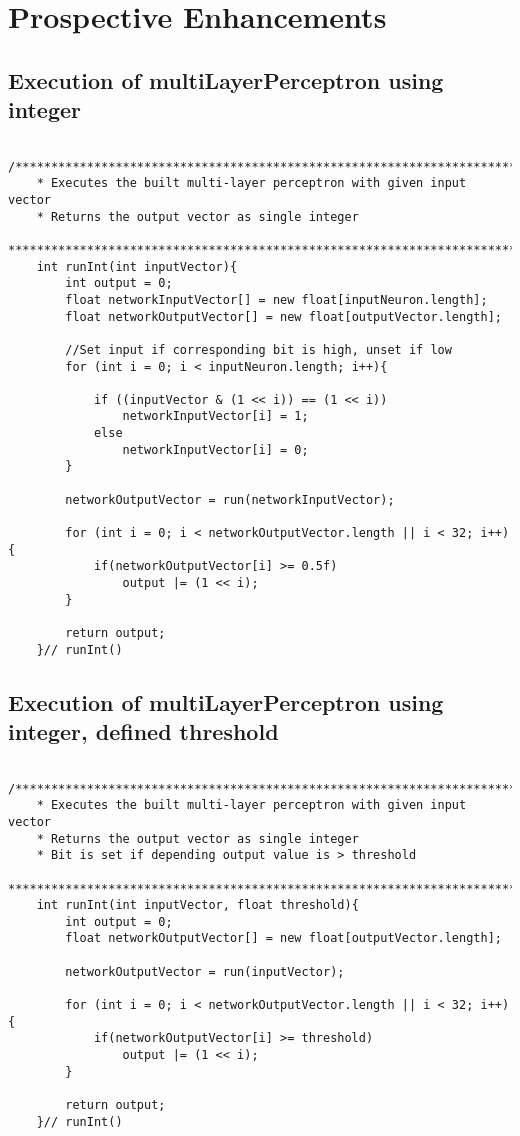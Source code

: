 \chapter{Prospective Enhancements}
\section{Execution of multiLayerPerceptron using integer}
\begin{lstlisting}
	/****************************************************************************************
	* Executes the built multi-layer perceptron with given input vector
	* Returns the output vector as single integer
	****************************************************************************************/
	int runInt(int inputVector){
		int output = 0;
		float networkInputVector[] = new float[inputNeuron.length];
		float networkOutputVector[] = new float[outputVector.length];
		
		//Set input if corresponding bit is high, unset if low
		for (int i = 0; i < inputNeuron.length; i++){
			
			if ((inputVector & (1 << i)) == (1 << i))
				networkInputVector[i] = 1;
			else
				networkInputVector[i] = 0;
		}
		
		networkOutputVector = run(networkInputVector);
		
		for (int i = 0; i < networkOutputVector.length || i < 32; i++){
			if(networkOutputVector[i] >= 0.5f)
				output |= (1 << i);
		}
		
		return output;
	}// runInt()
\end{lstlisting}

\section{Execution of multiLayerPerceptron using integer, defined threshold}
\begin{lstlisting}
	/****************************************************************************************
	* Executes the built multi-layer perceptron with given input vector
	* Returns the output vector as single integer
	* Bit is set if depending output value is > threshold
	****************************************************************************************/
	int runInt(int inputVector, float threshold){
		int output = 0;
		float networkOutputVector[] = new float[outputVector.length];
		
		networkOutputVector = run(inputVector);
		
		for (int i = 0; i < networkOutputVector.length || i < 32; i++){
			if(networkOutputVector[i] >= threshold)
				output |= (1 << i);
		}
		
		return output;
	}// runInt()
\end{lstlisting}


